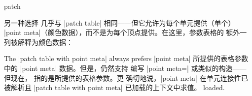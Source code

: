 {\begin{plottype}[/pgfplots]{patch}
\begin{pgfplotskeylist}
        另一种选择  几乎与
        |patch table| 相同——但它允许为每个单元提供（单个）
        |point meta|（颜色数据），而不是为每个顶点提供。在这里，参数表格的
        额外一列被解释为颜色数据：
\begin{codeexample}[]
\end{codeexample}
        \noindent The |patch table with point meta| always prefers |point meta|
        所提供的表格参数中的 |point meta| 数据。但是，仍然支持
        编写 |point meta=\thisrow| 或类似的构造——
        但现在， 指的是所提供的表格参数。更
        确切地说，|point meta| 在单元连接性已被解析且
        |patch table with point meta| 已加载的上下文中求值。
        loaded.


\end{pgfplotskeylist}
\end{plottype}}
